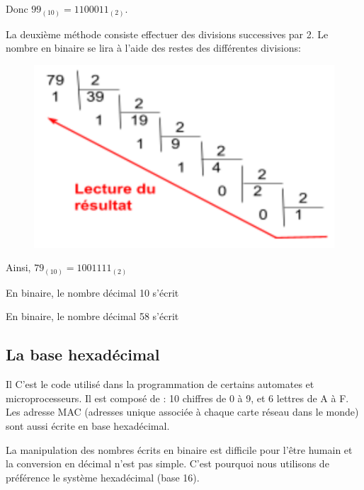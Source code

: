Donc $99_{(10)}=1100011_{(2)}$.


\;

La deuxième méthode consiste  effectuer des divisions successives par 2. Le nombre en binaire se lira à l'aide des restes des différentes divisions:

\begin{figure}[h]
	\begin{center}
		\includegraphics[scale=.5]{Images/intro/divisionbinaire}
	\end{center}
\end{figure}

Ainsi, $79_{(10)}=1001111_{(2)}$

\begin{myexamples}
	\item En binaire, le nombre décimal 10 s'écrit
	\vspace{3cm}
	\item En binaire, le nombre décimal 58 s'écrit
	\vspace{3cm}	
\end{myexamples}

\subsection{La base hexadécimal}
Il 
C'est le code utilisé dans la programmation de certains automates et microprocesseurs. Il est composé de : 10 chiffres de 0 à 9, et 6 lettres de A à F. Les adresse MAC (adresses unique associée à chaque carte réseau dans le monde) sont aussi écrite en base hexadécimal.

La manipulation des nombres écrits en binaire est difficile pour l'être humain et la conversion en décimal n'est pas simple. C'est pourquoi nous utilisons de préférence le système hexadécimal (base 16). 

